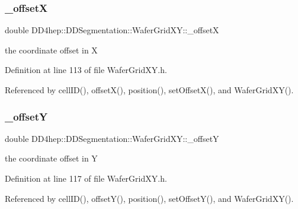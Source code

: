 \subsubsection{\texorpdfstring{\+\_\+offsetX}{\_offsetX}}
{\footnotesize\ttfamily double D\+D4hep\+::\+D\+D\+Segmentation\+::\+Wafer\+Grid\+X\+Y\+::\+\_\+offsetX\hspace{0.3cm}{\ttfamily [protected]}}



the coordinate offset in X 



Definition at line 113 of file Wafer\+Grid\+X\+Y.\+h.



Referenced by cell\+I\+D(), offset\+X(), position(), set\+Offset\+X(), and Wafer\+Grid\+X\+Y().

\hypertarget{class_d_d4hep_1_1_d_d_segmentation_1_1_wafer_grid_x_y_a560e795ea397f1a782c15d1e782f70ae}{}\label{class_d_d4hep_1_1_d_d_segmentation_1_1_wafer_grid_x_y_a560e795ea397f1a782c15d1e782f70ae} 
\subsubsection{\texorpdfstring{\+\_\+offsetY}{\_offsetY}}
{\footnotesize\ttfamily double D\+D4hep\+::\+D\+D\+Segmentation\+::\+Wafer\+Grid\+X\+Y\+::\+\_\+offsetY\hspace{0.3cm}{\ttfamily [protected]}}



the coordinate offset in Y 



Definition at line 117 of file Wafer\+Grid\+X\+Y.\+h.



Referenced by cell\+I\+D(), offset\+Y(), position(), set\+Offset\+Y(), and Wafer\+Grid\+X\+Y().

\hypertarget{class_d_d4hep_1_1_d_d_segmentation_1_1_wafer_grid_x_y_ad9ff5f530eeddcdbe40f2362a96bcd84}{}\label{class_d_d4hep_1_1_d_d_segmentation_1_1_wafer_grid_x_y_ad9ff5f530eeddcdbe40f2362a96bcd84} 
